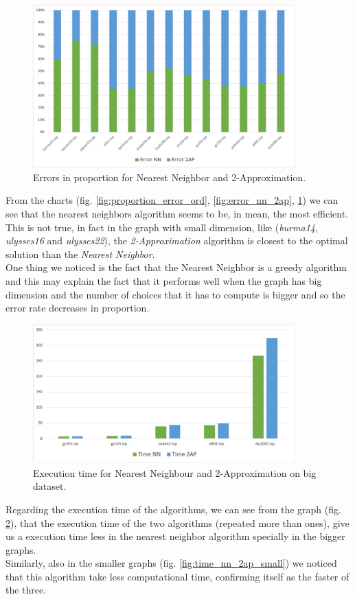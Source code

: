 \begin{figure}[H]
    \centering
    \includegraphics[width=0.9\textwidth]{./img/error_nn_2ap_prop.png}
    \caption{Errors in proportion for Nearest Neighbor and 2-Approximation.}
    \label{fig:error_nn_2ap_prop}
\end{figure}
\noindent
From the charts (fig. \ref{fig:proportion_error_ord}, \ref{fig:error_nn_2ap}, \ref{fig:error_nn_2ap_prop}) we can see that the nearest neighbors algorithm seems to be, in mean, the most efficient. This is not true, in fact in the graph with small dimension, like (\textit{burma14}, \textit{ulysses16} and \textit{ulysses22}), the \textit{2-Approximation} algorithm is closest to the optimal solution than the \textit{Nearest Neighbor}.\\
One thing we noticed is the fact that the Nearest Neighbor is a greedy algorithm and this may explain the fact that it performs well when the graph has big dimension and the number of choices that it has to compute is bigger and so the error rate decreases in proportion.

\begin{figure}[H]
    \centering
    \includegraphics[width=0.9\textwidth]{./img/time_nn_2ap_big.png}
    \caption{Execution time for Nearest Neighbour and 2-Approximation on big dataset.}
    \label{fig:time_nn_2ap_big}
\end{figure}
\noindent
Regarding the execution time of the algorithms, we can see from the graph (fig. \ref{fig:time_nn_2ap_big}), that the execution time of the two algorithms (repeated more than ones), give us a execution time less in the nearest neighbor algorithm specially in the bigger graphs.\\
Similarly, also in the smaller graphs (fig. \ref{fig:time_nn_2ap_small}) we noticed that this algorithm take less computational time, confirming itself as the faster of the three.

